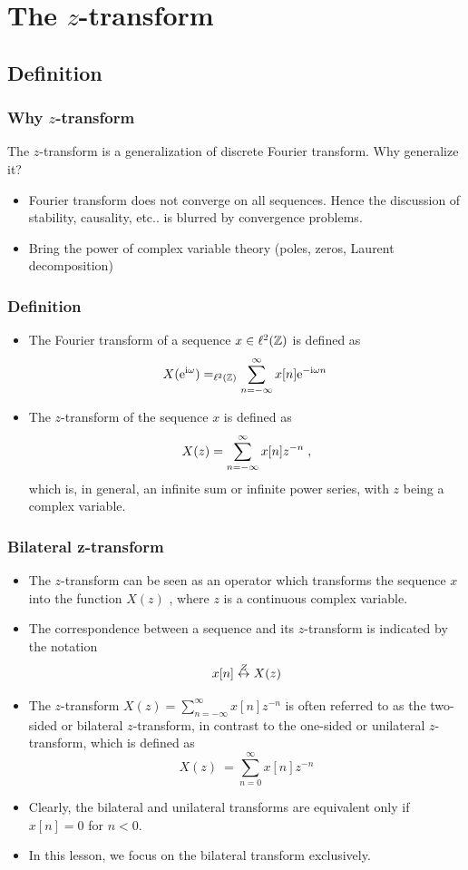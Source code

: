 \begin{frame}

\end{frame}
\section{The $z$-transform}
\subsection{Definition}
\begin{frame}
\frametitle{Why $z$-transform}
The $z$-transform is a generalization of discrete Fourier transform. Why generalize it?
\begin{itemize}
\item Fourier transform does not converge on all sequences. Hence the discussion of stability, causality, etc.. is blurred by convergence problems.
\item Bring the power of complex variable theory (poles, zeros, Laurent decomposition)
\end{itemize}
\end{frame}

\begin{frame}
\frametitle{Definition}
\begin{itemize}
\item The Fourier transform of a sequence $x \in \ell^2(\mathbb{Z})$ is defined as
\[
X(\mathrm{e}^{\mathrm{i} \omega}) =_{\ell^2(\mathbb{Z})} \sum_{n=-\infty}^\infty x[n] \mathrm{e}^{-\mathrm{i} \omega n} \;
\]
\item The $z$-transform of the sequence $x$ is defined as
\[
X(z)= \sum_{n=-\infty}^{\infty} x[n] z^{-n} \;,
\]
which is, in general, an infinite sum or infinite power series, with $z$ being a complex variable. 
\end{itemize}
\end{frame}



\begin{frame}
\frametitle{Bilateral z-transform}
\begin{itemize}
\item The $z$-transform can be seen as an operator which transforms the sequence $x$ into the function $X(z)$ , where $z$ is a continuous complex variable. 
\item The correspondence between a sequence and its $z$-transform is indicated by the notation
$$
x[n] \stackrel{Z}{\leftrightarrow} X(z)
$$
\item The $z$-transform $X(z)= \sum_{n=-\infty}^\infty x[n] z^{-n}$ is often referred to as the \alert{two-sided} or \alert{bilateral} $z$-transform, in contrast to the \alert{one-sided} or \alert{unilateral} $z$-transform, which is defined as
$$
X(z)\ =\sum_{n=0}^{\infty}x[n]z^{-n}
$$
\item Clearly, the bilateral and unilateral transforms are equivalent only if $x[n]=0$ for $n<0$. 
\item In this lesson, we focus on the bilateral transform exclusively.
\end{itemize}
\end{frame}


